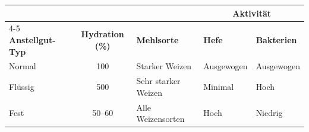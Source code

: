 \begin{tabular}{@{}lclll@{}}
\toprule
                     &                         & &\multicolumn{2}{c}{\textbf{Aktivität}}\\
                                                                         \cmidrule(ll){4-5}
\textbf{Anstellgut-Typ} & \textbf{Hydration (\%)} & \textbf{Mehlsorte}  & \textbf{Hefe} & \textbf{Bakterien} \\ \midrule
Normal              & 100                     & Starker Weizen       & Ausgewogen      & Ausgewogen          \\
Flüssig               & 500                     & Sehr starker Weizen  & Minimal       & Hoch              \\
Fest                & 50--60                  & Alle Weizensorten          & Hoch          & Niedrig               \\
\bottomrule
\end{tabular}
